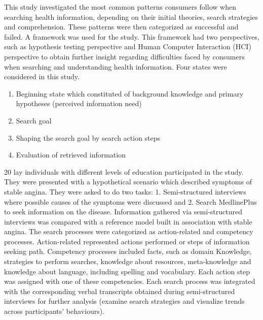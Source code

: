 \documentclass[]{article}
\begin{document}
\begin{enumerate}
This study investigated the most common patterns consumers follow when searching health information, depending on their initial theories, search strategies and comprehension. These patterns were then categorized as successful and failed. A framework was used for the study. This framework had two perspectives, such as hypothesis testing perspective and Human Computer Interaction (HCI) perspective to obtain further insight regarding difficulties faced by consumers when searching and understanding health information. Four states were considered in this study. 

\begin{enumerate}
		\item Beginning state which constituted of background knowledge and primary hypotheses (perceived information need)
		
		\item Search goal
		
		\item Shaping the search goal by search action steps
		
		\item Evaluation of retrieved information    
\end{enumerate}


20 lay individuals with different levels of education participated in the study. They were presented with a hypothetical scenario which described symptoms of \textquotesingle stable angina\textquotesingle. They were asked to do two tasks: 1. Semi-structured interviews where possible causes of the symptoms were discussed and 2. Search MedlinePlus to seek information on the disease. Information gathered via semi-structured interviews was compared with a reference model built in association with \textquotesingle stable angina\textquotesingle. The search processes were categorized as action-related and competency processes. Action-related represented actions performed or steps of information seeking path. Competency processes included facts, such as domain Knowledge, strategies to perform searches, knowledge about resources, meta-knowledge and knowledge about language, including spelling and vocabulary. Each action step was assigned with one of these competencies. Each search process was integrated with the corresponding verbal transcripts obtained during semi-structured interviews for further analysis (examine search strategies and visualize trends across participants’ behaviours). 


\end{enumerate}
\end{document}
